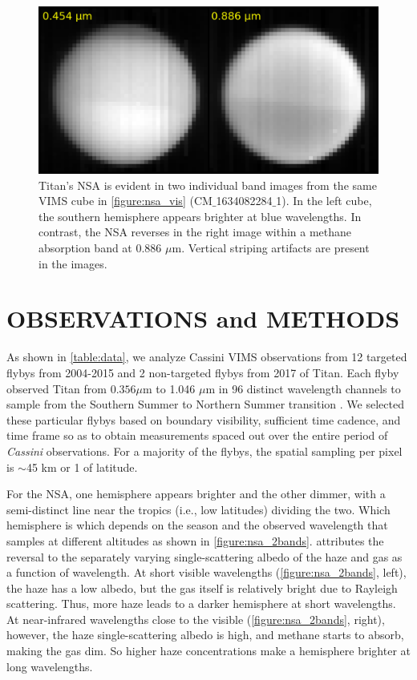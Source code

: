 \documentclass[apj,tighten]{emulateapj}
\begin{document}
\begin{figure}[!htbp]
\includegraphics[width=\columnwidth]{figures/nsa_2wvlns.png}
\caption{\footnotesize Titan’s NSA is evident in two individual band images from the same VIMS cube in \autoref{figure:nsa_vis} (CM$\_$1634082284$\_$1).
In the left cube, the southern hemisphere appears brighter at blue wavelengths.
In contrast, the NSA reverses in the right image within a methane absorption band at 0.886 $\mu$m. Vertical striping artifacts are present in the images.
\label{figure:nsa_2bands}}
\end{figure}


\section{OBSERVATIONS and METHODS}

As shown in \autoref{table:data}, we analyze Cassini VIMS observations from 12 targeted flybys from 2004-2015 and 2 non-targeted flybys from 2017 of Titan.
Each flyby observed Titan from $ 0.356\mu$m to 1.046 $\mu$m in 96 distinct wavelength channels to sample from the Southern Summer to Northern Summer transition \citep{brown2004cassini}. 
We selected these particular flybys based on boundary visibility, sufficient time cadence, and time frame so as to obtain measurements spaced out over the entire period of \textit{Cassini} observations.
For a majority of the flybys, the spatial sampling per pixel is $\sim$45 km or 1\degree{} of latitude. 


For the NSA, one hemisphere appears brighter and the other dimmer, with a semi-distinct line near the tropics (i.e., low latitudes) dividing the two.
Which hemisphere is which depends on the season and the observed wavelength that samples at different altitudes as shown in \autoref{figure:nsa_2bands}.
\cite{lorenz1997titan} attributes the reversal to the separately varying single-scattering albedo of the haze and gas as a function of wavelength. 
At short visible wavelengths (\autoref{figure:nsa_2bands}, left), the haze has a low albedo, but the gas itself is relatively bright due to Rayleigh scattering. Thus, more haze leads to a darker hemisphere at short wavelengths. 
At near-infrared wavelengths close to the visible (\autoref{figure:nsa_2bands}, right), however, the haze single-scattering albedo is high, and methane starts to absorb, making the gas dim. 
So higher haze concentrations make a hemisphere brighter at long wavelengths. 
\end{document}
